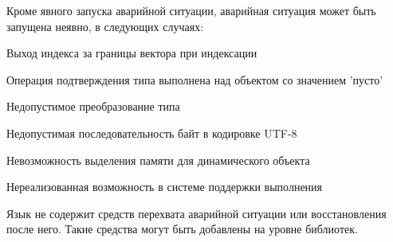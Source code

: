 Кроме явного запуска аварийной ситуации, аварийная ситуация может быть запущена неявно, в следующих случаях:
\begin{d_itemize}
\item
    Выход индекса за границы вектора при индексации
\item
    Операция подтверждения типа выполнена над объектом со значением 'пусто'
\item
    Недопустимое преобразование типа 
\item
    Недопустимая последовательность байт в кодировке UTF-8
\item
    Невозможность выделения памяти для динамического объекта
\item
    Нереализованная возможность в системе поддержки выполнения
\end{d_itemize}

\bigskip
Язык \thelang{} не содержит средств перехвата аварийной ситуации или восстановления после него. 
Такие средства могут быть добавлены на уровне библиотек.

